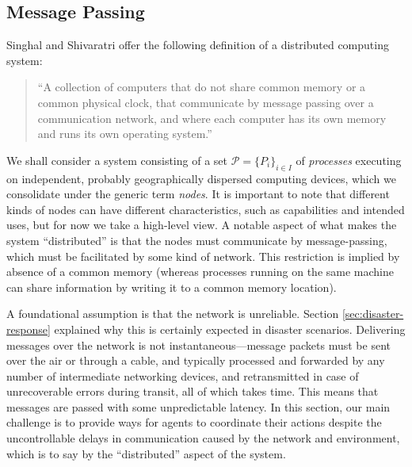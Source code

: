 \documentclass[]             %
{NASA}                       %
\theoremstyle{definition}
\begin{document}
\subsection{Message Passing}
\label{ssec:message-passing}

Singhal and Shivaratri \cite{10.5555/562065} offer the following
definition of a distributed computing system:

\begin{quote}
  ``A collection of computers that do not share common memory or a common
  physical clock, that communicate by message passing over a communication
  network, and where each computer has its own memory and runs its own
  operating system.''
\end{quote}
We shall consider a system consisting of a set \(\mathcal{P} =
\{P_i\}_{i\in I}\) of \emph{processes} executing on independent,
probably geographically dispersed computing devices, which we
consolidate under the generic term \emph{nodes}. It is important to
note that different kinds of nodes can have different characteristics,
such as capabilities and intended uses, but for now we take a
high-level view. A notable aspect of what makes the system
``distributed'' is that the nodes must communicate by message-passing,
which must be facilitated by some kind of network. This restriction is
implied by absence of a common memory (whereas processes running on
the same machine can share information by writing it to a common
memory location).

A foundational assumption is that the network is unreliable. Section
\ref{sec:disaster-response} explained why this is certainly expected
in disaster scenarios. Delivering messages over the network is not
instantaneous---message packets must be sent over the air or through a
cable, and typically processed and forwarded by any number of
intermediate networking devices, and retransmitted in case of
unrecoverable errors during transit, all of which takes time. This
means that messages are passed with some unpredictable latency. In
this section, our main challenge is to provide ways for agents to
coordinate their actions despite the uncontrollable delays in
communication caused by the network and environment, which is to say
by the ``distributed'' aspect of the system.
\end{document}
